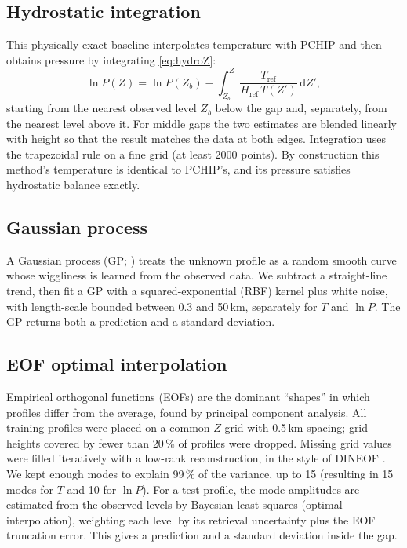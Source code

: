 \documentclass[11pt,a4paper]{article}
\newcommand{\dd}{\mathrm{d}}
\newcommand{\Href}{H_{\mathrm{ref}}}
\newcommand{\Tref}{T_{\mathrm{ref}}}
\begin{document}
\subsection{Hydrostatic integration}
This physically exact baseline interpolates temperature with PCHIP and then obtains pressure by integrating \cref{eq:hydroZ}:
\begin{equation}
\ln P(Z) = \ln P(Z_b) - \int_{Z_b}^{Z} \frac{\Tref}{\Href\,T(Z')}\,\dd Z', \label{eq:hydroint}
\end{equation}
starting from the nearest observed level $Z_b$ below the gap and, separately, from the nearest level above it. For middle gaps the two estimates are blended linearly with height so that the result matches the data at both edges. Integration uses the trapezoidal rule on a fine grid (at least 2000 points). By construction this method's temperature is identical to PCHIP's, and its pressure satisfies hydrostatic balance exactly.

\subsection{Gaussian process}
A Gaussian process (GP; \citealp{rasmussen2006}) treats the unknown profile as a random smooth curve whose wiggliness is learned from the observed data. We subtract a straight-line trend, then fit a GP with a squared-exponential (RBF) kernel plus white noise, with length-scale bounded between 0.3 and 50\,km, separately for $T$ and $\ln P$. The GP returns both a prediction and a standard deviation.

\subsection{EOF optimal interpolation}
Empirical orthogonal functions (EOFs) are the dominant ``shapes'' in which profiles differ from the average, found by principal component analysis. All training profiles were placed on a common $Z$ grid with 0.5\,km spacing; grid heights covered by fewer than 20\,\% of profiles were dropped. Missing grid values were filled iteratively with a low-rank reconstruction, in the style of DINEOF \citep{beckers2003}. We kept enough modes to explain 99\,\% of the variance, up to 15 (resulting in 15 modes for $T$ and 10 for $\ln P$). For a test profile, the mode amplitudes are estimated from the observed levels by Bayesian least squares (optimal interpolation), weighting each level by its retrieval uncertainty plus the EOF truncation error. This gives a prediction and a standard deviation inside the gap.
\end{document}
